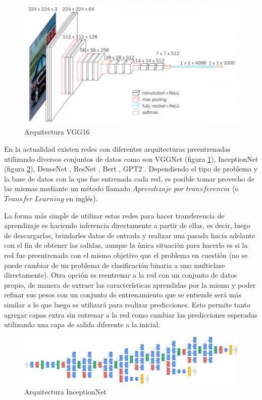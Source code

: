 \begin{figure}[!h]
	\centering
	\includegraphics[width=1\linewidth]{images/vgg16}
	\caption[Arquitectura VGG16]{Arquitectura VGG16}
	\label{fig:vgg16}
\end{figure}

En la actualidad existen redes con diferentes arquitecturas preentrenadas utilizando diversos conjuntos de datos como son VGGNet \cite{simonyan2014very} (figura \ref{fig:vgg16}), InceptionNet \cite{szegedy2015going} (figura \ref{fig:googlenet}), DenseNet \cite{huang2017densely}, ResNet \cite{he2016deep}, Bert \cite{devlin2018bert}, GPT2 \cite{radford2019language}. Dependiendo el tipo de problema y la base de datos con la que fue entrenada cada red, es posible tomar provecho de las mismas mediante un método llamado \(Aprendizaje\) \(por\; transferencia\) (o \(Transfer\;Learning\) en inglés). 

La forma más simple de utilizar estas redes para hacer transferencia de aprendizaje es haciendo inferencia directamente a partir de ellas, es decir, luego de descargarlas, brindarles datos de entrada y realizar una pasada hacia adelante con el fin de obtener las salidas, aunque la única situación para hacerlo es si la red fue preentrenada con el mismo objetivo que el problema en cuestión (no se puede cambiar de un problema de clasificación binaria a uno multiclase directamente). Otra opción es reentrenar a la red con un conjunto de datos propio, de manera de extraer las características aprendidas por la misma y poder refinar sus pesos con un conjunto de entrenamiento que se entiende será más similar a lo que luego se utilizará para realizar predicciones. 
Esto permite tanto agregar capas extra sin entrenar a la red como cambiar las predicciones esperadas utilizando una capa de salida diferente a la inicial.

\begin{figure}
	\centering
	\includegraphics[width=1\linewidth]{images/googlenet}
	\caption[Arquitectura InceptionNet]{Arquitectura InceptionNet}
	\label{fig:googlenet}
\end{figure}
